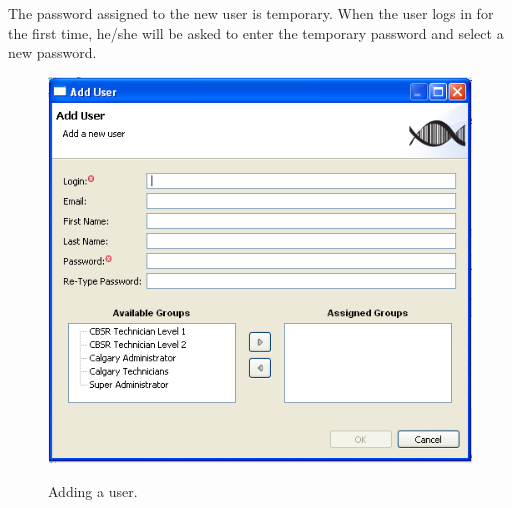 The password assigned to the new user is temporary. When the user logs in for
the first time, he/she will be asked to enter the temporary password and
select a new password.
\begin{figure}[H]
  \centering
  \scalebox{0.5}
	   { \includegraphics*{screenshots/administration/add_user} }
	   \caption{Adding a user.}
	   \label{fig:add_user}
\end{figure}


